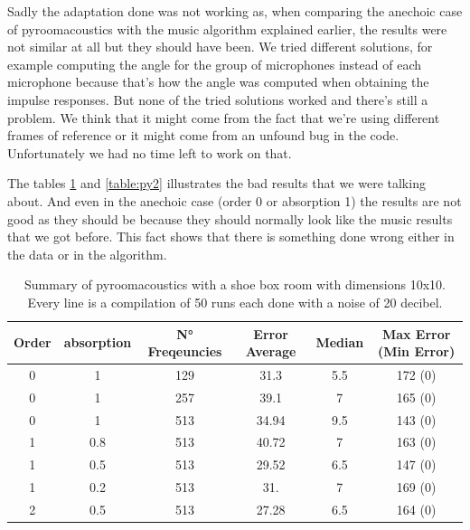 Sadly the adaptation done was not working as, when comparing the anechoic case of pyroomacoustics with the music algorithm explained earlier, the results were not similar at all but they should have been. We tried different solutions, for example computing the angle for the group of microphones instead of each microphone because that's how the angle was computed when obtaining the impulse responses. But none of the tried solutions worked and there's still a problem. We think that it might come from the fact that we're using different frames of reference or it might come from an unfound bug in the code. Unfortunately we had no time left to work on that. 

The tables \ref{table:py1} and \ref{table:py2} illustrates the bad results that we were talking about. And even in the anechoic case (order 0 or absorption 1) the results are not good as they should be because they should normally look like the music results that we got before. This fact shows that there is something done wrong either in the data or in the algorithm. 


\begin{table}[H]
   \centering
    \begin{tabular}{|c|c|c|c|c|c|}
      \hline
      Order & absorption & N° Freqeuncies & Error Average & Median & Max Error (Min Error) \\
      \hline
      0 & 1 & 129 & 31.3 & 5.5 & 172 (0) \\
      0 & 1 & 257 & 39.1 & 7 & 165 (0) \\
      0 & 1 & 513 & 34.94 & 9.5 & 143 (0) \\
      1 & 0.8 & 513 & 40.72 & 7 & 163 (0) \\
      1 & 0.5 & 513 & 29.52 & 6.5 & 147 (0) \\
      1 & 0.2 & 513 & 31. & 7 & 169 (0) \\
      2 & 0.5 & 513 & 27.28 & 6.5 & 164 (0) \\
      \hline
    \end{tabular}
    \caption{Summary of pyroomacoustics with a shoe box room with dimensions 10x10. Every line is a compilation of 50 runs each done with a noise of 20 decibel.}
    \label{table:py1}
\end{table}


